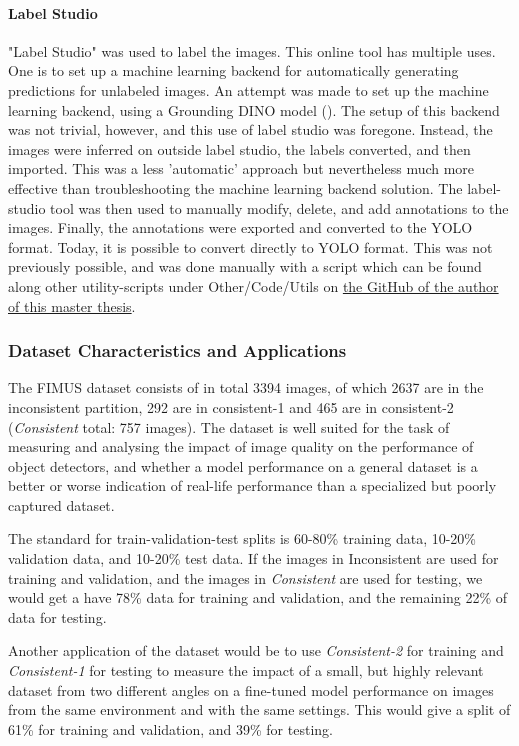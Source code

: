\paragraph{Label Studio}
"Label Studio" was used to label the images. This online tool has multiple uses. One is to set up a machine learning backend for automatically generating predictions for unlabeled images. An attempt was made to set up the machine learning backend, using a Grounding DINO model (\cite{liu2023grounding}). The setup of this backend was not trivial, however, and this use of label studio was foregone. Instead, the images were inferred on outside label studio, the labels converted, and then imported. This was a less 'automatic' approach but nevertheless much more effective than troubleshooting the machine learning backend solution. The label-studio tool was then used to manually modify, delete, and add annotations to the images. Finally, the annotations were exported and converted to the YOLO format. Today, it is possible to convert directly to YOLO format. This was not previously possible, and was done manually with a script which can be found along other utility-scripts under Other/Code/Utils on \href{https://github.com/Hallvaeb/masterthesis}{the GitHub of the author of this master thesis}.

\subsubsection{Dataset Characteristics and Applications}
\label{sec:dataset_characteristics}
The FIMUS dataset consists of in total 3394 images, of which 2637 are in the inconsistent partition, 292 are in consistent-1 and 465 are in consistent-2 (\textit{Consistent} total: 757 images). The dataset is well suited for the task of measuring and analysing the impact of image quality on the performance of object detectors, and whether a model performance on a general dataset is a better or worse indication of real-life performance than a specialized but poorly captured dataset. 

\newpage
The standard for train-validation-test splits is 60-80\% training data, 10-20\% validation data, and 10-20\% test data. If the images in Inconsistent are used for training and validation, and the images in \textit{Consistent} are used for testing, we would get a have 78\% data for training and validation, and the remaining 22\% of data for testing. 

Another application of the dataset would be to use\textit{ Consistent-2} for training and \textit{Consistent-1} for testing to measure the impact of a small, but highly relevant dataset from two different angles on a fine-tuned model performance on images from the same environment and with the same settings. This would give a split of 61\% for training and validation, and 39\% for testing.

